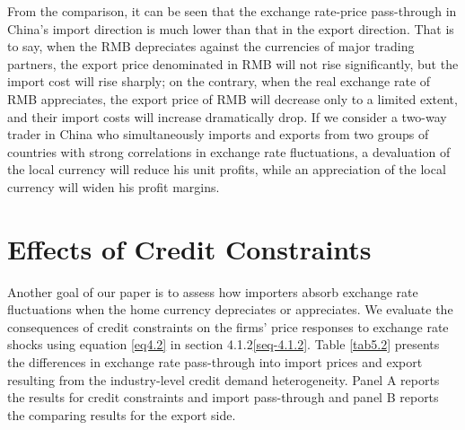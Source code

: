 From the comparison, it can be seen that the exchange rate-price pass-through in China's import direction is much lower than that in the export direction. That is to say, when the RMB depreciates against the currencies of major trading partners, the export price denominated in RMB will not rise significantly, but the import cost will rise sharply; on the contrary, when the real exchange rate of RMB appreciates, the export price of RMB will decrease only to a limited extent, and their import costs will increase dramatically drop. If we consider a two-way trader in China who simultaneously imports and exports from two groups of countries with strong correlations in exchange rate fluctuations, a devaluation of the local currency will reduce his unit profits, while an appreciation of the local currency will widen his profit margins.

\section{Effects of Credit Constraints}\label{sec-5.2}

Another goal of our paper is to assess how importers absorb exchange rate fluctuations when the home currency depreciates or appreciates. We evaluate the consequences of credit constraints on the firms' price responses to exchange rate shocks using equation \ref{eq4.2} in section 4.1.2\ref{seq-4.1.2}. Table \ref{tab5.2} presents the differences in exchange rate pass-through into import prices and export resulting from the industry-level credit demand heterogeneity. Panel A reports the results for credit constraints and import pass-through and panel B reports the comparing results for the export side. 

